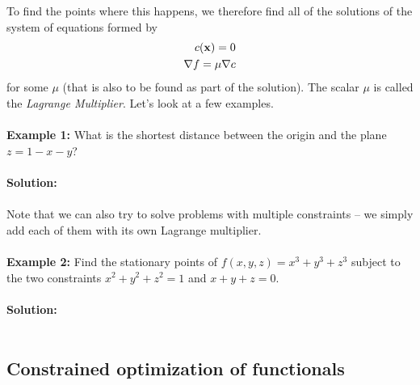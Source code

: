To find the points where this happens, we therefore find all of the solutions of the system of equations formed by 
\begin{eqnarray}
 c({\bf x}) = 0 \\
 \nabla f = \mu \nabla c 
 \end{eqnarray}
for some $\mu$ (that is also to be found as part of the solution). The scalar $\mu$ is called the {\it Lagrange Multiplier}. 
Let's look at a few examples.
\\
\\
{\bf Example 1:} What is the shortest distance between the origin and the plane $z = 1-x-y$? 
\\
\\
{\color{red} {\bf Solution: }}
\\
\\
Note that we can also try to solve problems with multiple constraints -- we simply add each of them with its own Lagrange multiplier.
\\
\\
{\bf Example 2:} Find the stationary points of $f(x,y,z) = x^3 + y^3 + z^3$ subject to the two constraints $x^2 + y^2 + z^2 = 1$ and $x+y+z = 0$.  
\\
\\
{\color{red} {\bf Solution: }}
\\
\\

\subsection{Constrained optimization of functionals}

